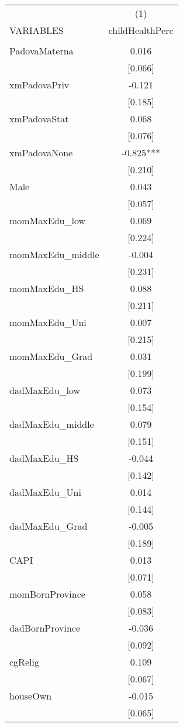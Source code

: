 \documentclass[]{article}
\begin{document}
\begin{tabular}{lc} \hline
 & (1) \\
VARIABLES & childHealthPerc \\ \hline
 &  \\
PadovaMaterna & 0.016 \\
 & [0.066] \\
xmPadovaPriv & -0.121 \\
 & [0.185] \\
xmPadovaStat & 0.068 \\
 & [0.076] \\
xmPadovaNone & -0.825*** \\
 & [0.210] \\
Male & 0.043 \\
 & [0.057] \\
momMaxEdu\_low & 0.069 \\
 & [0.224] \\
momMaxEdu\_middle & -0.004 \\
 & [0.231] \\
momMaxEdu\_HS & 0.088 \\
 & [0.211] \\
momMaxEdu\_Uni & 0.007 \\
 & [0.215] \\
momMaxEdu\_Grad & 0.031 \\
 & [0.199] \\
dadMaxEdu\_low & 0.073 \\
 & [0.154] \\
dadMaxEdu\_middle & 0.079 \\
 & [0.151] \\
dadMaxEdu\_HS & -0.044 \\
 & [0.142] \\
dadMaxEdu\_Uni & 0.014 \\
 & [0.144] \\
dadMaxEdu\_Grad & -0.005 \\
 & [0.189] \\
CAPI & 0.013 \\
 & [0.071] \\
momBornProvince & 0.058 \\
 & [0.083] \\
dadBornProvince & -0.036 \\
 & [0.092] \\
cgRelig & 0.109 \\
 & [0.067] \\
houseOwn & -0.015 \\
 & [0.065] \\

\end{tabular}
\end{document}
